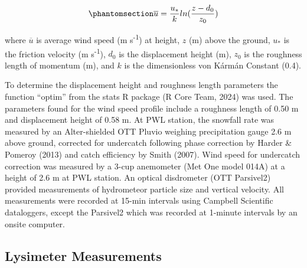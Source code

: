 \documentclass[
  letterpaper,
  DIV=11,
  numbers=noendperiod]{scrartcl}
\begin{document}
\begin{equation}\phantomsection\label{eq-log-wind-profile}{
\overline{u} = \frac{u_*}{k} ln(\frac{z - d_0}{z_0})
}\end{equation}

where \(\overline{u}\) is average wind speed (m s\textsuperscript{-1})
at height, \(z\) (m) above the ground, \(u_*\) is the friction velocity
(m s\textsuperscript{-1}), \(d_0\) is the displacement height (m),
\(z_0\) is the roughness length of momentum (m), and \(k\) is the
dimensionless von Kármán Constant (0.4).

To determine the displacement height and roughness length parameters the
function ``optim'' from the stats R package (R Core Team, 2024) was
used. The parameters found for the wind speed profile include a
roughness length of 0.50 m and displacement height of 0.58 m. At PWL
station, the snowfall rate was measured by an Alter-shielded OTT Pluvio
weighing precipitation gauge 2.6 m above ground, corrected for
undercatch following phase correction by Harder \& Pomeroy (2013) and
catch efficiency by Smith (2007). Wind speed for undercatch correction
was measured by a 3-cup anemometer (Met One model 014A) at a height of
2.6 m at PWL station. An optical disdrometer (OTT Parsivel2) provided
measurements of hydrometeor particle size and vertical velocity. All
measurements were recorded at 15-min intervals using Campbell Scientific
dataloggers, except the Parsivel2 which was recorded at 1-minute
intervals by an onsite computer.

\subsection{Lysimeter Measurements}\label{lysimeter-measurements}
\end{document}
